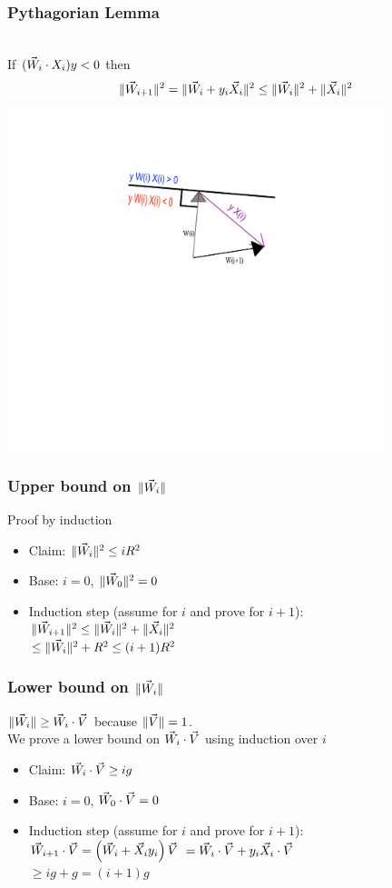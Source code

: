 \documentclass{beamer}
\begin{document}
\begin{frame}
\frametitle{Pythagorian Lemma}
~\\
If $(\vec{W}_i \cdot X_i) y <0$ then\\
\pause
\[
\| \vec{W}_{i+1} \|^2 = \|\vec{W}_i + y_i \vec{X}_i\|^2 \leq \|\vec{W}_i\|^2 + \|\vec{X}_i\|^2 
\]
\pause
\includegraphics[height=10cm]{PerceptronAnim/PerceptronError.pdf}
\end{frame}

\begin{frame}
\frametitle{Upper bound on $\| \vec{W}_i \|$}
\pause
Proof by induction
\begin{itemize}
\item Claim: $ \| \vec{W}_{i} \|^2 \leq i R^2 $
\item Base: $i=0$, $\|\vec{W}_0\|^2 = 0$
\item Induction step (assume for $i$ and prove for $i+1$):\\
$ \| \vec{W}_{i+1} \|^2 \leq \|\vec{W}_i\|^2 + \|\vec{X}_i\|^2 $ \\
$\leq \|\vec{W}_i\|^2 + R^2 \leq (i+1) R^2$

\end{itemize}
\end{frame}

\begin{frame}
\frametitle{Lower bound on $\| \vec{W}_i \|$}
\pause
$\|\vec{W}_i\| \geq \vec{W}_{i} \cdot \vec{V}$ because $\| \vec{V} \|=1$.\\
\pause
We prove a lower bound on $\vec{W}_{i} \cdot \vec{V}$ using induction over $i$
\begin{itemize}
\item Claim: $ \vec{W}_{i} \cdot \vec{V} \geq i g $
\item Base: $i=0$, $\vec{W}_0 \cdot \vec{V} = 0$
\item Induction step (assume for $i$ and prove for $i+1$):\\
$ \vec{W}_{i+1} \cdot \vec{V}  = \left( \vec{W}_i + \vec{X}_i y_i \right) \vec{V}$
\pause
$= \vec{W}_i \cdot \vec{V} + y_i \vec{X}_i \cdot \vec{V}$ \\
$\geq i g + g = (i+1) g$
\end{itemize}
\end{frame}
\end{document}

